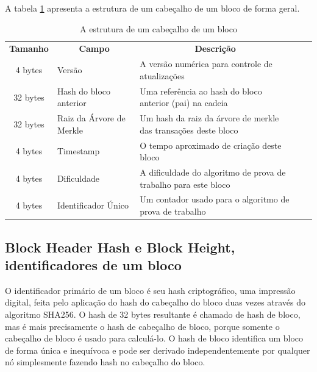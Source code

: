     A tabela \ref{tabela_estrutura_cabecalho_de_um_bloco} apresenta a estrutura de um cabeçalho de um bloco de forma geral.
    
    \begin{table}[H]  
        \begin{tabular}{|c|l|l|ll}
        \cline{1-3}
        \cellcolor[HTML]{9AFF99}\textbf{Tamanho} & \multicolumn{1}{c|}{\cellcolor[HTML]{9AFF99}\textbf{Campo}} & \multicolumn{1}{c|}{\cellcolor[HTML]{9AFF99}\textbf{Descrição}} &  &  \\ \cline{1-3}
        4 bytes                                  & Versão                                                      & A versão numérica para controle de atualizações                 &  &  \\ \cline{1-3}
        32 bytes                                 & Hash do bloco anterior                                      & Uma referência ao hash do bloco anterior (pai) na cadeia        &  &  \\ \cline{1-3}
        32 bytes                                 & Raiz da Árvore de Merkle                                    & Um hash da raiz da árvore de merkle das transações deste bloco  &  &  \\ \cline{1-3}
        4 bytes                                  & Timestamp                                                   & O tempo aproximado de criação deste bloco                       &  &  \\ \cline{1-3}
        4 bytes                                  & Dificuldade                                                 & A dificuldade do algoritmo de prova de trabalho para este bloco &  &  \\ \cline{1-3}
        4 bytes                                  & Identificador Único                                         & Um contador usado para o algoritmo de prova de trabalho         &  &  \\ \cline{1-3}
        \end{tabular}
        \caption{A estrutura de um cabeçalho de um bloco}
        \label{tabela_estrutura_cabecalho_de_um_bloco}
    \end{table}



    \subsection{Block Header Hash e Block Height, identificadores de um bloco}
    
    O identificador primário de um bloco é seu hash criptográfico, uma impressão digital, feita pelo aplicação do hash do cabeçalho do bloco duas vezes através do algoritmo SHA256. O hash de 32 bytes resultante é chamado de hash de bloco, mas é mais precisamente o hash de cabeçalho de bloco, porque somente o cabeçalho de bloco é usado para calculá-lo. O hash de bloco identifica um bloco de forma única e inequívoca e pode ser derivado independentemente por qualquer nó simplesmente fazendo hash no cabeçalho do bloco.\cite{mastering_blockchain_andreas}
    
